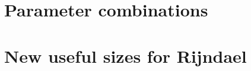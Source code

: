 \documentclass[a4paper,twoside]{llncs}
\begin{document}
\section{Parameter combinations}

\section{New useful sizes for Rijndael}
\cite{Daemen:1999:EBC:1267115.1267119}

% 



\end{document}
